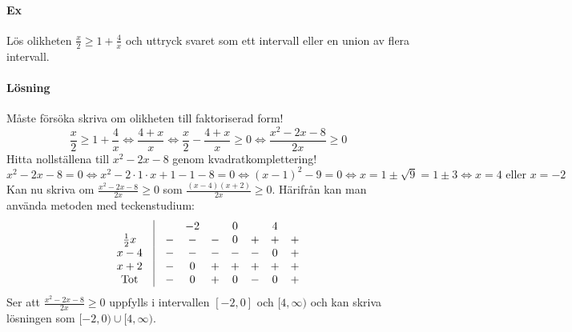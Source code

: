 \clearpage

\paragraph{Ex}
Lös olikheten $\frac{x}{2}\geq 1+ \frac{4}{x}$ och uttryck svaret som ett intervall eller en union av flera intervall.
\paragraph{Lösning}
Måste försöka skriva om olikheten till faktoriserad form!
\begin{equation*}
    \frac{x}{2}\geq 1+\frac{4}{x}\Leftrightarrow
    \frac{4+x}{x}\Leftrightarrow
    \frac{x}{2}-\frac{4+x}{x}\geq 0\Leftrightarrow
    \frac{x^2-2x-8}{2x}\geq 0
\end{equation*}
Hitta nollställena till $x^2-2x-8$ genom kvadratkomplettering!
\begin{equation*}
    x^2-2x-8=0 \Leftrightarrow
    x^2-2\cdot 1\cdot x+1-1-8=0 \Leftrightarrow
    (x-1)^2-9=0\Leftrightarrow
    x=1\pm \sqrt{9}=1\pm 3\Leftrightarrow
    x=4\text{ eller } x=-2
\end{equation*}
Kan nu skriva om $\frac{x^2-2x-8}{2x}\geq 0$ som $\frac{(x-4)(x+2)}{2x}\geq 0$.
Härifrån kan man använda metoden med teckenstudium:
\begin{equation*}
    \begin{matrix}
                     & \vline &   & -2 &   & 0 &   & 4 &   \\
        \frac{1}{2}x & \vline & - & -  & - & 0 & + & + & + \\
        x-4          & \vline & - & -  & - & - & - & 0 & + \\
        x+2          & \vline & - & 0  & + & + & + & + & + \\
        \text{Tot}   & \vline & - & 0  & + & 0 & - & 0 & +
    \end{matrix}
\end{equation*}
Ser att $\frac{x^2-2x-8}{2x}\geq 0$ uppfylls i intervallen $[-2,0]$ och $[4,\infty)$ och kan skriva lösningen som $[-2,0)\cup[4,\infty)$.
